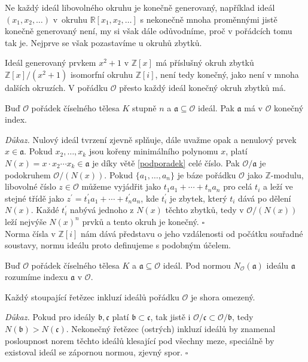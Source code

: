 \documentclass[12pt]{report}
\begin{document}
Ne každý ideál libovolného okruhu je konečně generovaný, například ideál $(x_1,x_2,\dots)$ v~okruhu $\mathbb{R}[x_1,x_2,\dots]$ s nekonečně mnoha proměnnými jistě konečně generovaný není, my si však dále odůvodníme, proč v pořádcích tomu tak je. Nejprve se však pozastavíme u okruhů zbytků.

Ideál generovaný prvkem $x^2+1$ v $\mathbb{Z}[x]$ má příslušný okruh zbytků $\mathbb{Z}[x]/(x^2+1)$ isomorfní okruhu $\mathbb{Z}[i]$, není tedy konečný, jako není v mnoha dalších  okruzích. V pořádku $\mathcal{O}$ přesto každý ideál konečný okruh zbytků má.

\begin{veta}
Buď $\mathcal{O}$ pořádek číselného tělesa $K$ stupně $n$ a $\mathfrak{a} \subseteq \mathcal{O}$ ideál. Pak $\mathfrak{a}$ má v $\mathcal{O}$ konečný index.
\end{veta}
\noindent \textit{Důkaz.} Nulový ideál tvrzení zjevně splňuje, dále uvažme opak a nenulový prvek $x \in \mathfrak{a}$. Pokud $x_2,\dots,x_k$ jsou kořeny minimálního polynomu $x$, platí $N(x) = x \cdot x_2 \cdots x_k \in \mathfrak{a}$ je díky větě \ref{podporadek} celé číslo. Pak $\mathcal{O}/\mathfrak{a}$ je podokruhem $\mathcal{O}/(N(x))$. Pokud $\lbrace a_1,\dots,a_n \rbrace$ je báze pořádku $\mathcal{O}$ jako $\mathbb{Z}$-modulu, libovolné číslo $z \in \mathcal{O}$ můžeme vyjádřit jako $t_1 a_1 + \cdots + t_n a_n$ pro celá $t_i$ a leží ve stejné třídě jako $z^\prime = t_1 ^\prime a_1 + \cdots + t_n ^\prime a_n$, kde $t_i ^\prime$ je zbytek, který $t_i$ dává po dělení $N(x)$. Každé $t_i ^\prime$ nabývá jednoho z $N(x)$ těchto zbytků, tedy v $\mathcal{O}/(N(x))$ leží nejvýše $N(x)^n$ prvků a tento okruh je konečný. \hfill $\square$\\

Norma čísla v $\mathbb{Z}[i]$ nám dává představu o jeho vzdálenosti od počátku souřadné soustavy, normu ideálu proto definujeme s podobným účelem.
\begin{definice}
Buď $\mathcal{O}$ pořádek číselného tělesa $K$ a $\mathfrak{a} \subseteq \mathcal{O}$ ideál. Pod normou $N_{\mathcal{O}}(\mathfrak{a})$ ideálu $\mathfrak{a}$ rozumíme indexu $\mathfrak{a}$ v $\mathcal{O}$.
\end{definice}

\begin{veta}\label{noether}
Každý stoupající řetězec inkluzí ideálů pořádku $\mathcal{O}$ je shora omezený.
\end{veta}
\textit{Důkaz.} Pokud pro ideály $\mathfrak{b},\mathfrak{c}$ platí $\mathfrak{b} \subset \mathfrak{c}$, tak jistě i $\mathcal{O}/\mathfrak{c} \subset \mathcal{O}/\mathfrak{b}$, tedy $N(\mathfrak{b}) > N(\mathfrak{c})$. Nekonečný řetězec (ostrých) inkluzí ideálů by znamenal posloupnost norem těchto ideálů klesající pod všechny meze, speciálně by existoval ideál se zápornou normou, zjevný spor. \hfill $\square$\\
\end{document}
